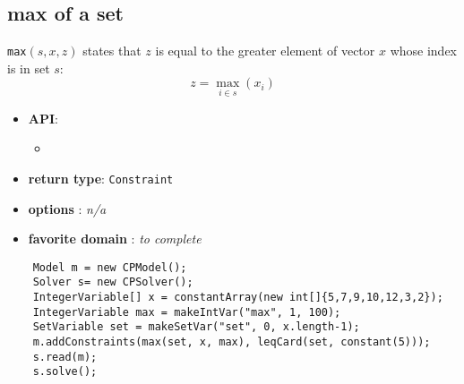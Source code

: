 \subsection{max of a set}\label{max:maxofaset}\hypertarget{max:maxofaset}{}

\begin{notedef}
\texttt{max}$(s,x,z)$ states that $z$ is equal to the greater element of vector $x$ whose index is in set $s$:
$$z = \max_{i\in s}( x_i )$$
  \end{notedef}

\begin{itemize}
	\item \textbf{API}:
	\begin{itemize}
		\item {}
	\end{itemize}
	\item \textbf{return type}: \texttt{Constraint}
	\item \textbf{options} : \emph{n/a}
	\item \textbf{favorite domain} : \emph{to complete}
\end{itemize}

\begin{lstlisting}
	Model m = new CPModel();
	Solver s= new CPSolver();
	IntegerVariable[] x = constantArray(new int[]{5,7,9,10,12,3,2});
	IntegerVariable max = makeIntVar("max", 1, 100);
	SetVariable set = makeSetVar("set", 0, x.length-1);
	m.addConstraints(max(set, x, max), leqCard(set, constant(5)));
	s.read(m);
	s.solve();
\end{lstlisting}
